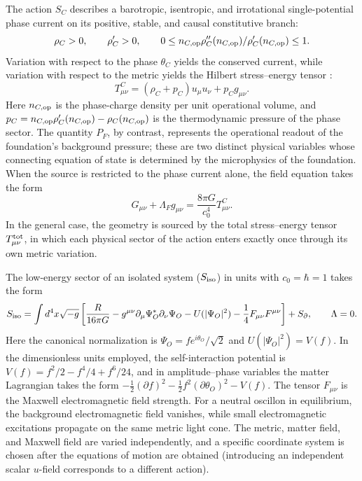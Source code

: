 \documentclass[11pt,a4paper]{article}
\begin{document}
The action $S_C$ describes a barotropic, isentropic, and irrotational single-potential phase current on its positive, stable, and causal constitutive branch:
\begin{equation}
\rho_C>0,\qquad \rho_C'>0,\qquad
0\le n_{C,{\rm op}}\rho_C''(n_{C,{\rm op}})/\rho_C'(n_{C,{\rm op}})\le1.
\end{equation}
Variation with respect to the phase $\theta_C$ yields the conserved current, while variation with respect to the metric yields the Hilbert stress--energy tensor \citep{brown1993fluid}:
\begin{equation}
T^C_{\mu\nu}=(\rho_C+p_C)u_\mu u_\nu+p_Cg_{\mu\nu}.
\end{equation}
Here $n_{C,{\rm op}}$ is the phase-charge density per unit operational volume, and $p_C=n_{C,{\rm op}}\rho_C'(n_{C,{\rm op}})-\rho_C(n_{C,{\rm op}})$ is the thermodynamic pressure of the phase sector. The quantity $P_F$, by contrast, represents the operational readout of the foundation's background pressure; these are two distinct physical variables whose connecting equation of state is determined by the microphysics of the foundation. When the source is restricted to the phase current alone, the field equation takes the form
\begin{equation}
G_{\mu\nu}+\Lambda_Fg_{\mu\nu}
=\frac{8\pi G}{c_0^4}T^C_{\mu\nu}.
\end{equation}
In the general case, the geometry is sourced by the total stress--energy tensor $T^{\rm tot}_{\mu\nu}$, in which each physical sector of the action enters exactly once through its own metric variation.

The low-energy sector of an isolated system ($S_{\rm iso}$) in units with $c_0=\hbar=1$ takes the form
\begin{equation}
S_{\rm iso}=\int d^4x\sqrt{-g}\left[
\frac{R}{16\pi G}
-g^{\mu\nu}\partial_\mu\Psi_O^*\partial_\nu\Psi_O
-U(|\Psi_O|^2)-\frac14F_{\mu\nu}F^{\mu\nu}
\right]+S_{\partial},\qquad \Lambda=0.
\end{equation}
Here the canonical normalization is $\Psi_O=f e^{i\theta_O}/\sqrt2$ and $U(|\Psi_O|^2)=V(f)$. In the dimensionless units employed, the self-interaction potential is $V(f)=f^2/2-f^4/4+f^6/24$, and in amplitude--phase variables the matter Lagrangian takes the form $-\tfrac12(\partial f)^2-\tfrac12f^2(\partial\theta_O)^2-V(f)$. The tensor $F_{\mu\nu}$ is the Maxwell electromagnetic field strength. For a neutral oscillon in equilibrium, the background electromagnetic field vanishes, while small electromagnetic excitations propagate on the same metric light cone. The metric, matter field, and Maxwell field are varied independently, and a specific coordinate system is chosen after the equations of motion are obtained (introducing an independent scalar $u$-field corresponds to a different action).
\end{document}

